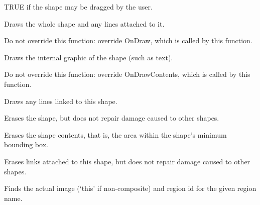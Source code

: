 

TRUE if the shape may be dragged by the user.



Draws the whole shape and any lines attached to it.

Do not override this function: override OnDraw, which is called
by this function.



Draws the internal graphic of the shape (such as
text).

Do not override this function: override OnDrawContents, which is called
by this function.



Draws any lines linked to this shape.



Erases the shape, but does not repair damage caused to other
shapes.



Erases the shape contents, that is, the area within the shape's
minimum bounding box.



Erases links attached to this shape, but does not repair
damage caused to other shapes.



Finds the actual image (`this' if non-composite) and region id for the given
region name.



